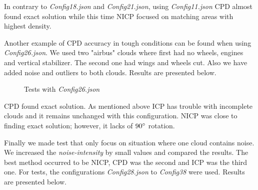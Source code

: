 \documentclass[titlepage]{article}
\begin{document}
In contrary to \textit{Config18.json} and \textit{Config21.json}, using \textit{Config11.json} CPD almost found exact solution while this time NICP focused on matching areas with highest density.

Another example of CPD accuracy in tough conditions can be found when using \textit{Config26.json}. We used two "airbus" clouds where first had no wheels, engines and vertical stabilizer. The second one had wings and wheels cut. Also we have added noise and outliers to both clouds. Results are presented below.

\begin{figure}[H]
	\centering
    \hspace{0.5em}
    \hspace{0.5em}
    \caption{Tests with \textit{Config26.json}}
\end{figure}

CPD found exact solution. As mentioned above ICP has trouble with incomplete clouds and it remains unchanged with this configuration. NICP was close to finding exact solution; however, it lacks of $90\degree$ rotation.

Finally we made test that only focus on situation where one cloud contains noise. We increased the \textit{noise-intensity} by small values and compared the results. The best method occurred to be NICP, CPD was the second and ICP was the third one. For tests, the configurations \textit{Config28.json} to \textit{Config38} were used. Results are presented below.
\end{document}
